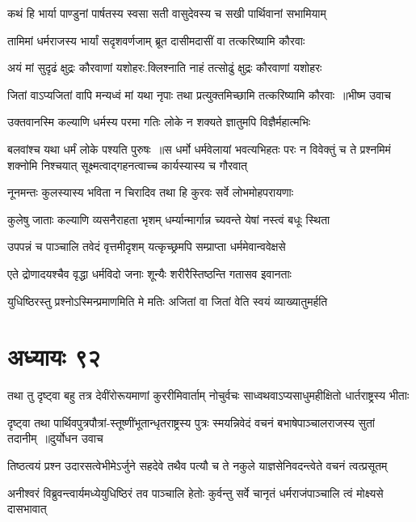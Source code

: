 \twolineshloka
{कथं हि भार्या पाण्डुनां पार्षतस्य स्वसा सती}
{वासुदेवस्य च सखी पार्थिवानां सभामियाम्}


\threelineshloka
{तामिमां धर्मराजस्य भार्यां सदृशवर्णजाम्}
{ब्रूत दासीमदासीं वा तत्करिष्यामि कौरवाः}
{}


\twolineshloka
{अयं मां सुदृढं क्षुद्रः कौरवाणां यशोहरः.क्लिश्नाति नाहं तत्सोढुं क्षुद्रः कौरवाणां यशोहरः}
{}


\twolineshloka
{जितां वाऽप्यजितां वापि मन्यध्वं मां यथा नृपाः}
{तथा प्रत्युक्तमिच्छामि तत्करिष्यामि कौरवाः ॥भीष्म उवाच}


\twolineshloka
{उक्तवानस्मि कल्याणि धर्मस्य परमा गतिः}
{लोके न शक्यते ज्ञातुमपि विज्ञैर्महात्मभिः}


बलवांश्च यथा धर्मं लोके पश्यति पुरुषः ॥स धर्मो धर्मवेलायां भवत्यभिहतः परः
\twolineshloka
{न विवेक्तुं च ते प्रश्नमिमं शक्नोमि निश्चयात्}
{सूक्ष्मत्वाद्गहनत्वाच्च कार्यस्यास्य च गौरवात्}


\twolineshloka
{नूनमन्तः कुलस्यास्य भविता न चिरादिव}
{तथा हि कुरवः सर्वे लोभमोहपरायणाः}


\twolineshloka
{कुलेषु जाताः कल्याणि व्यसनैराहता भृशम्}
{धर्म्यान्मार्गान्न च्यवन्ते येषां नस्त्वं बधूः स्थिता}


\twolineshloka
{उपपन्नं च पाञ्चालि तवेदं वृत्तमीदृशम्}
{यत्कृच्छ्रमपि सम्प्राप्ता धर्ममेवान्ववेक्षसे}


\twolineshloka
{एते द्रोणादयश्चैव वृद्धा धर्मविदो जनाः}
{शून्यैः शरीरैस्तिष्ठन्ति गतासव इवानताः}


\twolineshloka
{युधिष्ठिरस्तु प्रश्नोऽस्मिन्प्रमाणमिति मे मतिः}
{अजितां वा जितां वेति स्वयं व्याख्यातुमर्हति}


\chapter{अध्यायः ९२}
\twolineshloka
{तथा तु दृष्ट्वा बहु तत्र देवींरोरूयमाणां कुररीमिवार्ताम्}
{नोचुर्वचः साध्वथवाऽप्यसाधुमहीक्षितो धार्तराष्ट्रस्य भीताः}


\twolineshloka
{दृष्ट्वा तथा पार्थिवपुत्रपौत्रां-स्तूष्णींभूतान्धृतराष्ट्रस्य पुत्रः}
{स्मयन्निवेदं वचनं बभाषेपाञ्चालराजस्य सुतां तदानीम् ॥दुर्योधन उवाच}


\twolineshloka
{तिष्ठत्वयं प्रश्न उदारसत्वेभीमेऽर्जुने सहदेवे तथैव}
{पत्यौ च ते नकुले याज्ञसेनिवदन्त्वेते वचनं त्वत्प्रसूतम्}


\twolineshloka
{अनीश्वरं विब्रुवन्त्वार्यमध्येयुधिष्ठिरं तव पाञ्चालि हेतोः}
{कुर्वन्तु सर्वे चानृतं धर्मराजंपाञ्चालि त्वं मोक्ष्यसे दासभावात्}


